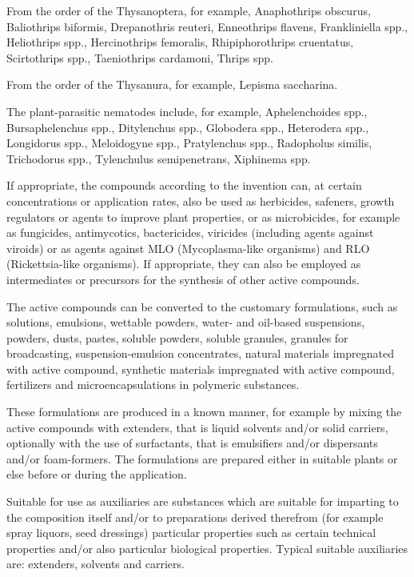 \documentclass[11pt,a4paper]{article}
\begin{document}
From the order of the Thysanoptera, for example, Anaphothrips obscurus, Baliothrips biformis, Drepanothris reuteri, Enneothrips flavens, Frankliniella spp., Heliothrips spp., Hercinothrips femoralis, Rhipiphorothrips cruentatus, Scirtothrips spp., Taeniothrips cardamoni, Thrips spp.

From the order of the Thysanura, for example, Lepisma saccharina.

The plant-parasitic nematodes include, for example, Aphelenchoides spp., Bursaphelenchus spp., Ditylenchus spp., Globodera spp., Heterodera spp., Longidorus spp., Meloidogyne spp., Pratylenchus spp., Radopholus similis, Trichodorus spp., Tylenchulus semipenetrans, Xiphinema spp.

If appropriate, the compounds according to the invention can, at certain concentrations or application rates, also be used as herbicides, safeners, growth regulators or agents to improve plant properties, or as microbicides, for example as fungicides, antimycotics, bactericides, viricides (including agents against viroids) or as agents against MLO (Mycoplasma-like organisms) and RLO (Rickettsia-like organisms). If appropriate, they can also be employed as intermediates or precursors for the synthesis of other active compounds.

The active compounds can be converted to the customary formulations, such as solutions, emulsions, wettable powders, water- and oil-based suspensions, powders, dusts, pastes, soluble powders, soluble granules, granules for broadcasting, suspension-emulsion concentrates, natural materials impregnated with active compound, synthetic materials impregnated with active compound, fertilizers and microencapsulations in polymeric substances.

These formulations are produced in a known manner, for example by mixing the active compounds with extenders, that is liquid solvents and/or solid carriers, optionally with the use of surfactants, that is emulsifiers and/or dispersants and/or foam-formers. The formulations are prepared either in suitable plants or else before or during the application.

Suitable for use as auxiliaries are substances which are suitable for imparting to the composition itself and/or to preparations derived therefrom (for example spray liquors, seed dressings) particular properties such as certain technical properties and/or also particular biological properties. Typical suitable auxiliaries are: extenders, solvents and carriers.
\end{document}
